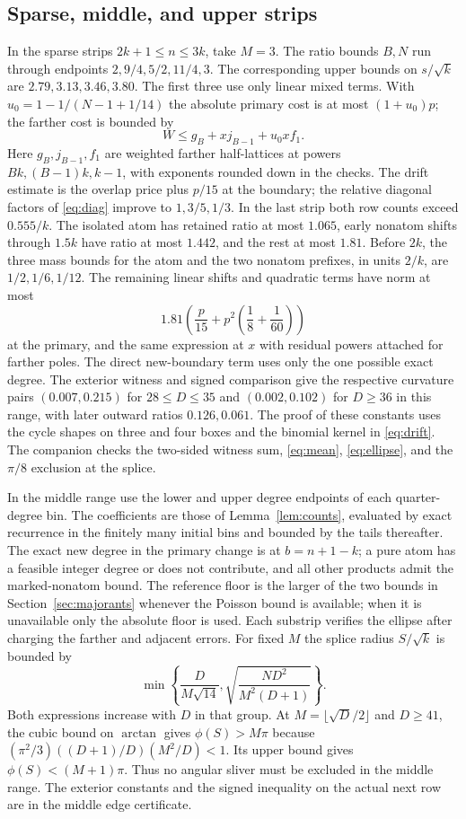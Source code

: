 \documentclass[11pt,reqno]{amsart}
\theoremstyle{remark}
\begin{document}
\subsection{Sparse, middle, and upper strips}
In the sparse strips $2k+1\le n\le3k$, take $M=3$. The ratio bounds $B,N$ run through endpoints $2,9/4,5/2,11/4,3$. The corresponding upper bounds on $s/\sqrt{k}$ are $2.79,3.13,3.46,3.80$. The first three use only linear mixed terms. With $u_0=1-1/(N-1+1/14)$ the absolute primary cost is at most $(1+u_0)p$; the farther cost is bounded by
\[
 W\le g_B+x j_{B-1}+u_0 x f_1 .
\]
Here $g_B,j_{B-1},f_1$ are weighted farther half-lattices at powers $Bk,(B-1)k,k-1$, with exponents rounded down in the checks. The drift estimate is the overlap price plus $p/15$ at the boundary; the relative diagonal factors of \eqref{eq:diag} improve to $1,3/5,1/3$. In the last strip both row counts exceed $0.555/k$. The isolated atom has retained ratio at most $1.065$, early nonatom shifts through $1.5k$ have ratio at most $1.442$, and the rest at most $1.81$. Before $2k$, the three mass bounds for the atom and the two nonatom prefixes, in units $2/k$, are $1/2,1/6,1/12$. The remaining linear shifts and quadratic terms have norm at most
\[
 1.81\left(\frac{p}{15}+
                  p^2\left(\frac18+\frac1{60}\right)\right)
\]
at the primary, and the same expression at $x$ with residual powers attached for farther poles. The direct new-boundary term uses only the one possible exact degree. The exterior witness and signed comparison give the respective curvature pairs
$(0.007,0.215)$ for $28\le D\le35$ and $(0.002,0.102)$ for $D\ge36$ in this range, with later outward ratios $0.126,0.061$. The proof of these constants uses the cycle shapes on three and four boxes and the binomial kernel in \eqref{eq:drift}. The companion checks the two-sided witness sum, \eqref{eq:mean}, \eqref{eq:ellipse}, and the $\pi/8$ exclusion at the splice.

In the middle range use the lower and upper degree endpoints of each quarter-degree bin. The coefficients are those of Lemma~\ref{lem:counts}, evaluated by exact recurrence in the finitely many initial bins and bounded by the tails thereafter. The exact new degree in the primary change is at $b=n+1-k$; a pure atom has a feasible integer degree or does not contribute, and all other products admit the marked-nonatom bound. The reference floor is the larger of the two bounds in Section~\ref{sec:majorants} whenever the Poisson bound is available; when it is unavailable only the absolute floor is used. Each substrip verifies the ellipse after charging the farther and adjacent errors. For fixed $M$ the splice radius $S/\sqrt{k}$ is bounded by
\[
 \min\left\{\frac{D}{M\sqrt{14}},
             \sqrt{\frac{ND^2}{M^2(D+1)}}\right\}.
\]
Both expressions increase with $D$ in that group. At $M=\lfloor\sqrt D/2\rfloor$ and $D\ge41$, the cubic bound on $\arctan$ gives $\phi(S)>M\pi$ because
$(\pi^2/3)((D+1)/D)(M^2/D)<1$. Its upper bound gives $\phi(S)<(M+1)\pi$. Thus no angular sliver must be excluded in the middle range. The exterior constants and the signed inequality on the actual next row are in the middle edge certificate.
\end{document}
